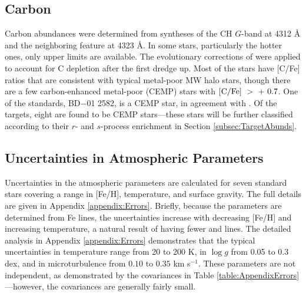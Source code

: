 \documentclass[preprint]{aastex61}
\begin{document}
\subsection{Carbon}\label{subsec:CFe}
Carbon abundances were determined from syntheses of the CH $G$-band at
4312 \AA \hspace{0.025in} and the neighboring feature at 4323 \AA.  In
some stars, particularly the hotter ones, only upper limits are
available.  The evolutionary corrections of \citet{Placco2014} were
applied to account for C depletion after the first dredge up.  Most of
the stars have [C/Fe] ratios that are consistent with typical
metal-poor MW halo stars, though there are a few carbon-enhanced
metal-poor (CEMP) stars with $[\rm{C/Fe}]~>~+~0.7$.  One of the standards,
BD$-$01 2582, is a CEMP star, in agreement with \citet{Roederer2014}.
Of the targets, eight are found to be CEMP stars---these stars will be
further classified according to their $r$- and $s$-process enrichment
in Section \ref{subsec:TargetAbunds}.

\subsection{Uncertainties in Atmospheric Parameters}\label{subsec:AtmParamErrors}
Uncertainties in the atmospheric parameters are calculated for
seven standard stars covering a range in [Fe/H], temperature, and
surface gravity.  The full details are given in Appendix
\ref{appendix:Errors}.  Briefly, because the parameters are determined
from Fe lines, the uncertainties increase with decreasing [Fe/H] and
increasing temperature, a natural result of having fewer 
and  lines.  The detailed analysis in Appendix
\ref{appendix:Errors} demonstrates that the typical uncertainties in
temperature range from 20 to 200 K, in $\log g$ from 0.05 to 0.3 dex,
and in microturbulence from $0.10$ to $0.35$ km s$^{-1}$.  These
parameters are not independent, as demonstrated by the
covariances in Table \ref{table:AppendixErrors}---however, the
covariances are generally fairly small.


\end{document}
